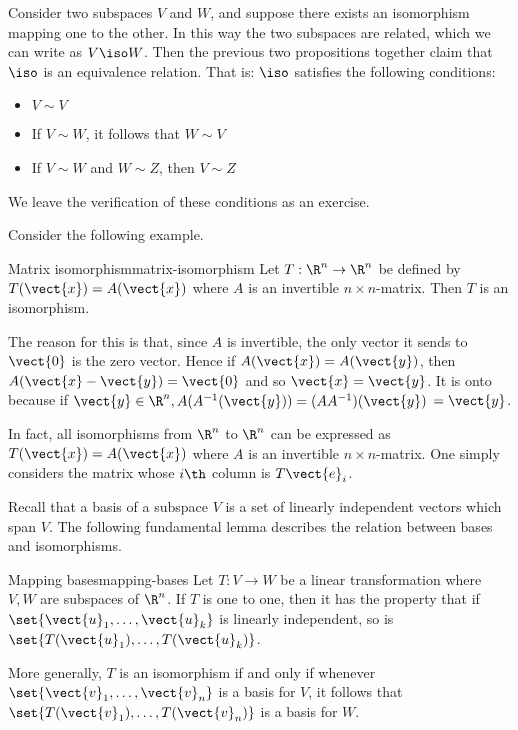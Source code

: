 Consider two subspaces $V$ and $W$, and suppose there exists an isomorphism mapping one to the other. In this way the two subspaces are related, which we can write as $V\iso W$. Then the previous two propositions together claim that $\iso$ is an equivalence relation. That is: $\iso$
satisfies the following conditions:

\begin{itemize}
\item $V\sim V$

\item If $V\sim W$, it follows that $W\sim V$

\item If $V\sim W$ and $W\sim Z$, then $V\sim Z$
\end{itemize}

We leave the verification of these conditions as an exercise.

Consider the following example. 

\begin{example}{Matrix isomorphism}{matrix-isomorphism}
Let $T:\R^{n}\rightarrow \R^{n}$ be defined by $T(\vect{x}) = A(\vect{x})$ where $A$ is an invertible $n\times n$-matrix. Then $T$ is
an isomorphism.
\end{example}

\begin{solution}
The reason for this is that, since $A$ is invertible, the only vector it
sends to $\vect{0}$ is the zero vector. Hence if $A(\vect{x})=A(\vect{y})$, then $A(\vect{x}-\vect{y}) =\vect{0}$ and so $\vect{x}=\vect{y}$. It is onto
because if $\vect{y}\in \R^{n},A(A^{-1} (\vect{y})) =(
AA^{-1}) (\vect{y})$ $=\vect{y}$. 
\end{solution}

In fact, all isomorphisms from $\R^{n}$ to $\R^{n}$ can be expressed as $T(\vect{x}) = A(\vect{x})$ where $A$ is an invertible $n \times n$-matrix. One
simply considers the matrix whose $i\th$ column is $T\vect{e}_{i}$.

Recall that a basis of a subspace $V$ is a set of linearly independent vectors which span $V$. The following fundamental lemma describes the relation between bases and
isomorphisms.

\begin{lemma}{Mapping bases}{mapping-bases}
Let $T:V\rightarrow W$ be a linear transformation where $V,W$ are
subspaces of $\R^n$. If $T$ is one to one, then it has the property that if $\set{\vect{u}_{1},\ldots,\vect{u}_{k}} $ is linearly independent, so is $\set{T(\vect{u}_{1}),\ldots,T(\vect{u}_{k})}$.

More generally, $T$ is an isomorphism if and only if whenever $\set{
\vect{v}_{1},\ldots,\vect{v}_{n}} $ is a basis for $V$, it follows that $\set{T
(\vect{v}_{1}),\ldots,T(\vect{v}_{n})} $ is a basis for $W$. 
\end{lemma}

